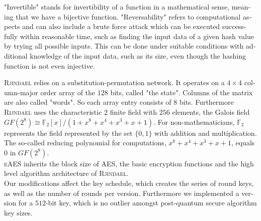 \documentclass[a4paper,11pt]{article}
\begin{document}
\begin{otherlanguage}{english}
\begin{multicols}{2}

\noindent
"Invertible" stands for invertibility of a function in a mathematical sense, meaning that we have a bijective function. "Reversability" refers to computational aspects and can also include a brute force attack which can be executed successfully within reasonable time, such as finding the input data of a given hash value by trying all possible inputs. This can be done under suitable conditions with additional knowledge of the input data, such as its size, even though the hashing function is not even injective.\\



\vspace{0.1cm}

\noindent
\textsc{Rjindael} relies on a substitution-permutation network. It operates on a $4 \times 4$ column-major order array of the $128$ bits, called "the state". Columns of the matrix are also called "words". So each array entry consists of $8$ bits. Furthermore \textsc{Rijndael} uses the characteristic $2$ finite field with $256$ elements, the Galois field $GF (2^8) \cong \mathbb{F}_2 [x]/(1 + x^8 + x^4 + x^3 + x + 1 )$. For non-mathematicians, $\mathbb{F}_2$ represents the field represented by the set $\{0, 1 \}$ with addition and multiplication. The so-called reducing polynomial for computations, $x^8+x^4+x^3+x+1$, equals $0$ in $GF (2^8)$.\\

\noindent
\textsc{eAES} inherits the block size of \textsc{AES}, the basic encryption functions and the high level algorithm architecture of \textsc{Rjindael}. \\

\noindent
Our modifications affect the key schedule, which creates the series of round keys, as well as the number of rounds per version. Furthermore we implemented a version for a $512$-bit key, which is no outlier amongst post-quantum secure algorithm key sizes. \\



\end{multicols}
\end{otherlanguage}
\end{document}
